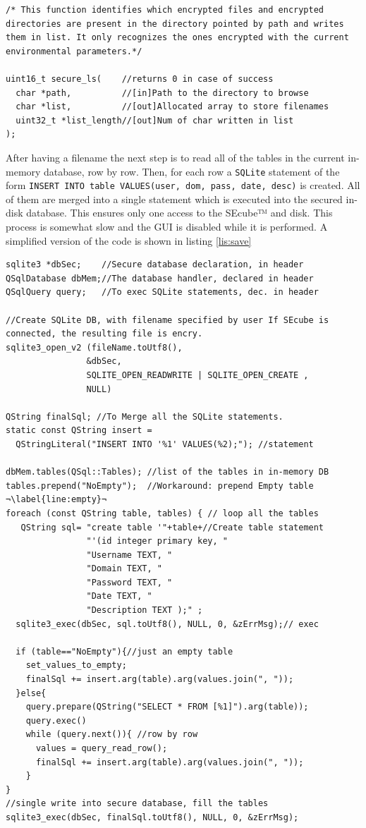 \begin{lstlisting}[style=customc, float=htb, caption={secure\_ls declaration}, label = {lis:securels}]
 /* This function identifies which encrypted files and encrypted directories are present in the directory pointed by path and writes them in list. It only recognizes the ones encrypted with the current environmental parameters.*/
 
uint16_t secure_ls(    //returns 0 in case of success
  char *path,          //[in]Path to the directory to browse
  char *list,          //[out]Allocated array to store filenames
  uint32_t *list_length//[out]Num of char written in list
);
\end{lstlisting}


After having a filename the next step is to read all of the tables in the current in-memory database, row by row. Then, for each row a \texttt{SQLite} statement of the form \texttt{INSERT INTO table VALUES(user, dom, pass, date, desc)} is created. All of them are merged into a single statement which is executed into the secured in-disk database. This ensures only one access to the SEcube™ and disk. This process is somewhat slow and the GUI is disabled while it is performed. A simplified version of the code is shown in listing \ref{lis:save} 

\begin{lstlisting}[style=customc, float=htb, caption={simplified Save process}, label = {lis:save}, escapechar=¬]
sqlite3 *dbSec;    //Secure database declaration, in header
QSqlDatabase dbMem;//The database handler, declared in header 
QSqlQuery query;   //To exec SQLite statements, dec. in header

//Create SQLite DB, with filename specified by user If SEcube is connected, the resulting file is encry.
sqlite3_open_v2 (fileName.toUtf8(),   
                &dbSec, 
                SQLITE_OPEN_READWRITE | SQLITE_OPEN_CREATE , 
                NULL) 
                
QString finalSql; //To Merge all the SQLite statements.
static const QString insert = 
  QStringLiteral("INSERT INTO '%1' VALUES(%2);"); //statement
  
dbMem.tables(QSql::Tables); //list of the tables in in-memory DB
tables.prepend("NoEmpty");  //Workaround: prepend Empty table   ¬\label{line:empty}¬
foreach (const QString table, tables) { // loop all the tables
   QString sql= "create table '"+table+//Create table statement 
                "'(id integer primary key, "
                "Username TEXT, "
                "Domain TEXT, "
                "Password TEXT, "
                "Date TEXT, "
                "Description TEXT );" ; 
  sqlite3_exec(dbSec, sql.toUtf8(), NULL, 0, &zErrMsg);// exec
  
  if (table=="NoEmpty"){//just an empty table
    set_values_to_empty;
    finalSql += insert.arg(table).arg(values.join(", "));
  }else{
    query.prepare(QString("SELECT * FROM [%1]").arg(table));
    query.exec()
    while (query.next()){ //row by row
      values = query_read_row();
      finalSql += insert.arg(table).arg(values.join(", "));
    }
}
//single write into secure database, fill the tables
sqlite3_exec(dbSec, finalSql.toUtf8(), NULL, 0, &zErrMsg);
\end{lstlisting}

